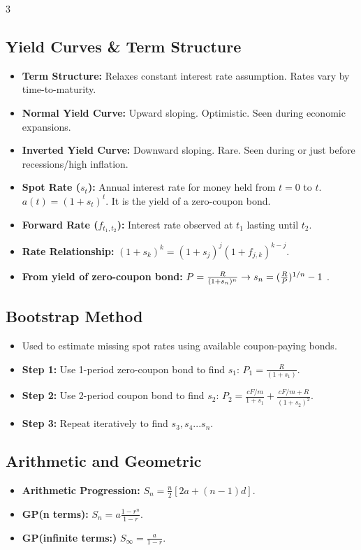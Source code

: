 \documentclass[8pt,a4paper,landscape]{extarticle}
\begin{document}
\begin{multicols*}{3}
    \subsection{Yield Curves \& Term Structure}
    \begin{itemize}
        \item \textbf{Term Structure:} Relaxes constant interest rate assumption. Rates vary by time-to-maturity.
        \item \textbf{Normal Yield Curve:} Upward sloping. Optimistic. Seen during economic expansions.
        \item \textbf{Inverted Yield Curve:} Downward sloping. Rare. Seen during or just before recessions/high inflation.
        \item \textbf{Spot Rate ($s_t$):} Annual interest rate for money held from $t=0$ to $t$. $a(t) = (1+s_t)^t$. It is the yield of a zero-coupon bond.
        \item \textbf{Forward Rate ($f_{t_1, t_2}$):} Interest rate observed at $t_1$ lasting until $t_2$.
        \item \textbf{Rate Relationship:} $(1+s_k)^k = (1+s_j)^j(1+f_{j,k})^{k-j}$.
        \item \textbf{From yield of zero-coupon bond:} $P = \frac{R}{(1 + s_n)^{n}} \rightarrow \\ s_n = (\frac{R}{P})^{1/n} - 1$ .
    \end{itemize}

    \subsection{Bootstrap Method}
    \begin{itemize}
        \item Used to estimate missing spot rates using available coupon-paying bonds.
        \item \textbf{Step 1:} Use 1-period zero-coupon bond to find $s_1$: $P_1 = \frac{R}{(1+s_1)}$.
        \item \textbf{Step 2:} Use 2-period coupon bond to find $s_2$: $P_2 = \frac{cF/m}{1+s_1} + \frac{cF/m + R}{(1+s_2)^2}$.
        \item \textbf{Step 3:} Repeat iteratively to find $s_3, s_4...s_n$.
    \end{itemize}

    \subsection{Arithmetic and Geometric}
    \begin{itemize}
        \item \textbf{Arithmetic Progression:} $S_n = \frac{n}{2} \left[ 2a + (n - 1)d \right]$.
        \item \textbf{GP(n terms):} $S_n = a \frac{1 - r^n}{1 - r}$.
        \item \textbf{GP(infinite terms:)} $S_{\infty} = \frac{a}{1 - r}$.
    \end{itemize}

\end{multicols*}
\end{document}
